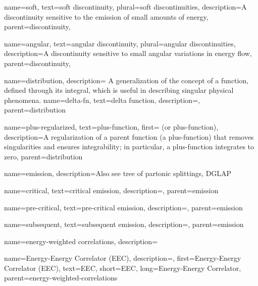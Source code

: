     {
        name=soft,
        text=soft discontinuity,
        plural=soft discontinuities,
        description={A discontinuity sensitive to the emission of small amounts of energy},
        parent=discontinuity,
    }

    {
        name=angular,
        text={angular discontinuity},
        plural={angular discontinuities},
        description={A discontinuity sensitive to small angular variations in energy flow},
        parent=discontinuity,
    }

{
    name=distribution,
    description={
        A generalization of the concept of a function, defined through its integral, which is useful in describing singular physical phenomena.
    }
}
    {
      name=delta-fn,
      text=delta function,
      description={},
      parent=distribution
    }

    {
      name=plus-regularized,
      text=plus-function,
      first= (or plus-function),
      description={A regularization of a parent function (a plus-function) that removes singularities and ensures integrability;
      in particular, a plus-function integrates to zero},
      parent=distribution
    }



{
    name=emission,
    description={Also see tree of partonic splittings, DGLAP}
}

    {
        name=critical,
        text=critical emission,
        description={},
        parent=emission
    }

    {
        name=pre-critical,
        text=pre-critical emission,
        description={},
        parent=emission
    }

    {
        name=subsequent,
        text=subsequent emission,
        description={},
        parent=emission
    }



{
    name=energy-weighted correlations,
    description={}
}


    {
        name=Energy-Energy Correlator (EEC),
        description={},
        first={Energy-Energy Correlator (EEC)},
        text={EEC},
        short={EEC},
        long={Energy-Energy Correlator},
        parent=energy-weighted-correlations
    }


